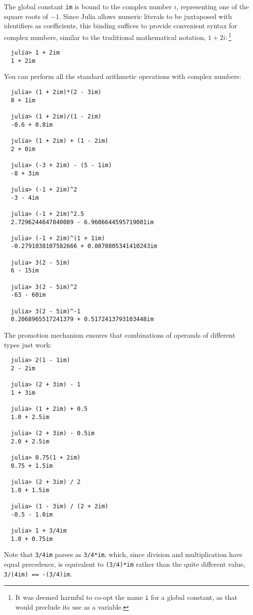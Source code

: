 \documentclass{article}
\begin{document}
The global constant \verb|im| is bound to the complex number $i$, representing one of the square roots of $-1$.
Since Julia allows numeric literals to be juxtaposed with identifiers as coefficients, this binding suffices to provide convenient syntax for complex numbers, similar to the traditional mathematical notation, $1 + 2i$:\,\footnote{It was deemed harmful to co-opt the name \texttt{i} for a global constant, as that would preclude its use as a variable.}
\begin{verbatim}
  julia> 1 + 2im
  1 + 2im
\end{verbatim}
You can perform all the standard arithmetic operations with complex numbers:
\begin{verbatim}
  julia> (1 + 2im)*(2 - 3im)
  8 + 1im

  julia> (1 + 2im)/(1 - 2im)
  -0.6 + 0.8im

  julia> (1 + 2im) + (1 - 2im)
  2 + 0im

  julia> (-3 + 2im) - (5 - 1im)
  -8 + 3im

  julia> (-1 + 2im)^2
  -3 - 4im

  julia> (-1 + 2im)^2.5
  2.7296244647840089 - 6.9606644595719001im

  julia> (-1 + 2im)^(1 + 1im)
  -0.2791038107582666 + 0.0870805341410243im

  julia> 3(2 - 5im)
  6 - 15im

  julia> 3(2 - 5im)^2
  -63 - 60im

  julia> 3(2 - 5im)^-1
  0.2068965517241379 + 0.5172413793103448im
\end{verbatim}
The promotion mechanism ensures that combinations of operands of different types just work:
\begin{verbatim}
  julia> 2(1 - 1im)
  2 - 2im

  julia> (2 + 3im) - 1
  1 + 3im

  julia> (1 + 2im) + 0.5
  1.0 + 2.5im

  julia> (2 + 3im) - 0.5im
  2.0 + 2.5im

  julia> 0.75(1 + 2im)
  0.75 + 1.5im

  julia> (2 + 3im) / 2
  1.0 + 1.5im

  julia> (1 - 3im) / (2 + 2im)
  -0.5 - 1.0im

  julia> 1 + 3/4im
  1.0 + 0.75im
\end{verbatim}
Note that \verb|3/4im| parses as \verb|3/4*im|, which, since division and multiplication have equal precedence, is equivalent to \verb|(3/4)*im| rather than the quite different value, \verb|3/(4im) == -(3/4)im|.
\end{document}
